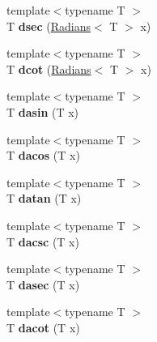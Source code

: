 \begin{DoxyCompactItemize}
\item 
\hypertarget{namespace_d_r_d_s_p_a4b20a69cae0b0a8363382f3adb38b62b}{{\footnotesize template$<$typename T $>$ }\\T {\bfseries dsec} (\hyperlink{struct_d_r_d_s_p_1_1_radians}{Radians}$<$ T $>$ x)}\label{namespace_d_r_d_s_p_a4b20a69cae0b0a8363382f3adb38b62b}

\item 
\hypertarget{namespace_d_r_d_s_p_a83eaee2781e8d0587b6f9ab2737109ab}{{\footnotesize template$<$typename T $>$ }\\T {\bfseries dcot} (\hyperlink{struct_d_r_d_s_p_1_1_radians}{Radians}$<$ T $>$ x)}\label{namespace_d_r_d_s_p_a83eaee2781e8d0587b6f9ab2737109ab}

\item 
\hypertarget{namespace_d_r_d_s_p_a52e497b1bb4cb1230fed11492400002a}{{\footnotesize template$<$typename T $>$ }\\T {\bfseries dasin} (T x)}\label{namespace_d_r_d_s_p_a52e497b1bb4cb1230fed11492400002a}

\item 
\hypertarget{namespace_d_r_d_s_p_ae45c32b22ce0990fdc2290f74dd3e43d}{{\footnotesize template$<$typename T $>$ }\\T {\bfseries dacos} (T x)}\label{namespace_d_r_d_s_p_ae45c32b22ce0990fdc2290f74dd3e43d}

\item 
\hypertarget{namespace_d_r_d_s_p_a72accb24f2e29c038679fa3a70a7da27}{{\footnotesize template$<$typename T $>$ }\\T {\bfseries datan} (T x)}\label{namespace_d_r_d_s_p_a72accb24f2e29c038679fa3a70a7da27}

\item 
\hypertarget{namespace_d_r_d_s_p_a47cf40b3ac58724b35ec0b9251243cb9}{{\footnotesize template$<$typename T $>$ }\\T {\bfseries dacsc} (T x)}\label{namespace_d_r_d_s_p_a47cf40b3ac58724b35ec0b9251243cb9}

\item 
\hypertarget{namespace_d_r_d_s_p_a22081226e768e095f0ea19c59a359a25}{{\footnotesize template$<$typename T $>$ }\\T {\bfseries dasec} (T x)}\label{namespace_d_r_d_s_p_a22081226e768e095f0ea19c59a359a25}

\item 
\hypertarget{namespace_d_r_d_s_p_a8e30ff85e5210a6d9c3cdebc99a5879c}{{\footnotesize template$<$typename T $>$ }\\T {\bfseries dacot} (T x)}\label{namespace_d_r_d_s_p_a8e30ff85e5210a6d9c3cdebc99a5879c}


\end{DoxyCompactItemize}
